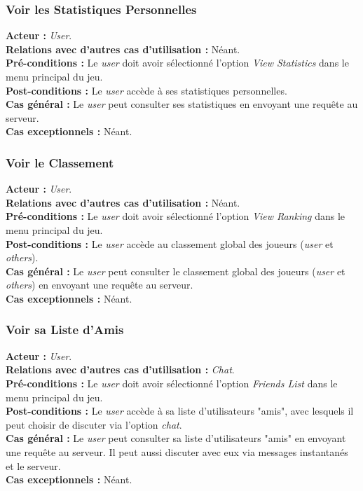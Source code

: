 \documentclass[10pt, a4paper]{article}
\begin{document}
\subsubsection{Voir les Statistiques Personnelles}
\textbf{Acteur :} \textit{User}.\\
\textbf{Relations avec d'autres cas d'utilisation :} Néant.\\
\textbf{Pré-conditions :} Le \textit{user} doit avoir sélectionné l'option \textit{View Statistics} dans le menu principal du jeu.\\
\textbf{Post-conditions :} Le \textit{user} accède à ses statistiques personnelles.\\
\textbf{Cas général :} Le \textit{user} peut consulter ses statistiques en envoyant une requête au serveur.\\
\textbf{Cas exceptionnels :} Néant.

\subsubsection{Voir le Classement}
\textbf{Acteur :} \textit{User}.\\
\textbf{Relations avec d'autres cas d'utilisation :} Néant.\\
\textbf{Pré-conditions :} Le \textit{user} doit avoir sélectionné l'option \textit{View Ranking} dans le menu principal du jeu.\\
\textbf{Post-conditions :} Le \textit{user} accède au classement global des joueurs (\textit{user} et \textit{others}).\\
\textbf{Cas général :} Le \textit{user} peut consulter le classement global des joueurs (\textit{user} et \textit{others}) en envoyant une requête au serveur.\\
\textbf{Cas exceptionnels :} Néant.

\subsubsection{Voir sa Liste d'Amis}
\textbf{Acteur :} \textit{User}.\\
\textbf{Relations avec d'autres cas d'utilisation :} \textit{Chat}.\\
\textbf{Pré-conditions :} Le \textit{user} doit avoir sélectionné l'option \textit{Friends List} dans le menu principal du jeu.\\
\textbf{Post-conditions :} Le \textit{user} accède à sa liste d'utilisateurs "amis", avec lesquels il peut choisir de discuter via l'option \textit{chat}.\\
\textbf{Cas général :} Le \textit{user} peut consulter sa liste d'utilisateurs "amis" en envoyant une requête au serveur. Il peut aussi discuter avec eux via messages instantanés et le serveur.\\
\textbf{Cas exceptionnels :} Néant.
\end{document}
